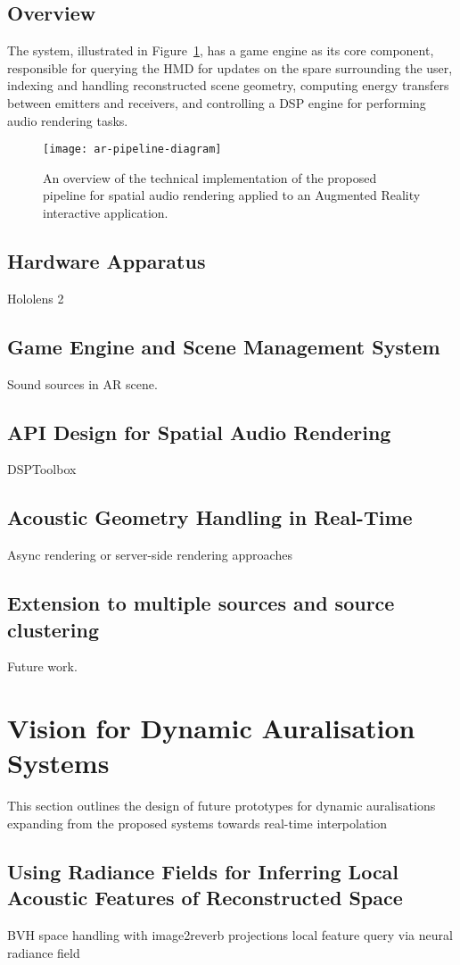 \subsection{Overview}
The system, illustrated in Figure~\ref{fig:ar-pipeline-overview}, has a game engine as its core component, responsible for querying the HMD for updates on the spare surrounding the user, indexing and handling reconstructed scene geometry, computing energy transfers between emitters and receivers, and controlling a DSP engine for performing audio rendering tasks.

\begin{figure}[htb]
    \centering
    \texttt{[image: ar-pipeline-diagram]}
    \caption{An overview of the technical implementation of the proposed pipeline for spatial audio rendering applied to an Augmented Reality interactive application. }
    \label{fig:ar-pipeline-overview}
\end{figure}

\subsection{Hardware Apparatus}
Hololens 2

\subsection{Game Engine and Scene Management System}
Sound sources in AR scene.

\subsection{API Design for Spatial Audio Rendering}
DSPToolbox

\subsection{Acoustic Geometry Handling in Real-Time}
Async rendering or server-side rendering approaches

\subsection{Extension to multiple sources and source clustering}
Future work.


\section{Vision for Dynamic Auralisation Systems}
This section outlines the design of future prototypes for dynamic auralisations expanding from the proposed systems towards real-time interpolation 

\subsection{Using Radiance Fields for Inferring Local Acoustic Features of Reconstructed Space}

BVH space handling with image2reverb projections
local feature query via neural radiance field

